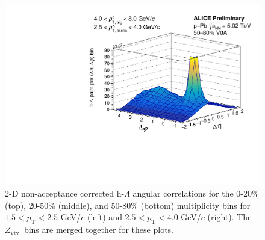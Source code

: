 \begin{figure}[ht]
\begin{minipage}{0.48\textwidth}
		\includegraphics[width=\textwidth]{figures/analysis/h_lambda_2d_nomixcor_fancy_label_50_80_highpt.pdf}
	\end{minipage}
	\caption{2-D non-acceptance corrected h-$\Lambda$ angular correlations for the 0-20\% (top), 20-50\% (middle), and 50-80\% (bottom) multiplicity bins for $1.5 < p_{\text{T}} < 2.5$ GeV/$c$ (left) and $2.5 < p_{\text{T}} < 4.0$ GeV/$c$ (right). The $Z_{\text{vtx.}}$ bins are merged together for these plots.}
	\label{fig:h_lambda_2d_nomixcor}
\end{figure}

